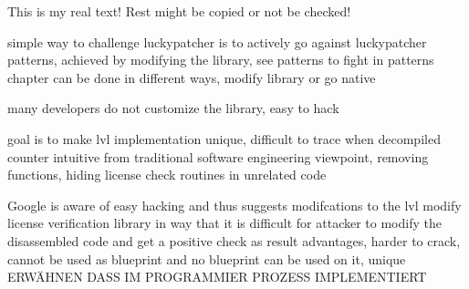 This is my real text! Rest might be copied or not be checked!

%
simple way to challenge luckypatcher is to actively go against luckypatcher patterns, achieved by modifying the library, see patterns to fight in patterns chapter
can be done in different ways, modify library or go native

many developers do not customize the library, easy to hack
\cite{munteanLicense}
%

%
goal is to make lvl implementation unique, difficult to trace when decompiled
counter intuitive from traditional software engineering viewpoint, removing functions, hiding license check routines in unrelated code

Google is aware of easy hacking and thus suggests modifcations to the lvl
modify license verification library in way that it is difficult for attacker to modify the disassembled code and get a positive check as result
advantages, harder to crack, cannot be used as blueprint and no blueprint can be used on it, unique
\cite{developersSecuring}
%
ERWÄHNEN DASS IM PROGRAMMIER PROZESS  IMPLEMENTIERT\newline
